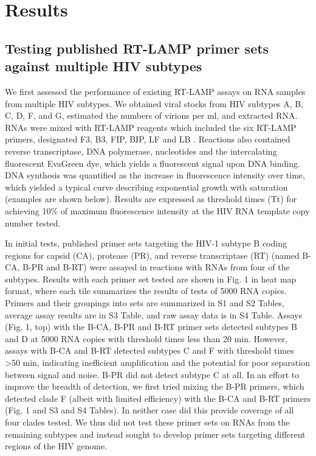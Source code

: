 \documentclass[../sherrill-Mix_thesis.tex]{subfiles}
\begin{document}
\section{Results}

\subsection{Testing published RT-LAMP primer sets against multiple HIV subtypes}

We first assessed the performance of existing RT-LAMP assays on RNA samples from multiple HIV subtypes. We obtained viral stocks from HIV subtypes A, B, C, D, F, and G, estimated the numbers of virions per ml, and extracted RNA. RNAs were mixed with RT-LAMP reagents which included the six RT-LAMP primers, designated F3, B3, FIP, BIP, LF and LB \citep{Notomi2000}. Reactions also contained reverse transcriptase, DNA polymerase, nucleotides and the intercalating fluorescent EvaGreen dye, which yields a fluorescent signal upon DNA binding. DNA synthesis was quantified as the increase in fluorescence intensity over time, which yielded a typical curve describing exponential growth with saturation (examples are shown below). Results are expressed as threshold times (Tt) for achieving 10\% of maximum fluorescence intensity at the HIV RNA template copy number tested.

In initial tests, published primer sets targeting the HIV-1 subtype B coding regions for capsid (CA), protease (PR), and reverse transcriptase (RT) (named B-CA, B-PR and B-RT) were assayed in reactions with RNAs from four of the subtypes. Results with each primer set tested are shown in Fig. 1 in heat map format, where each tile summarizes the results of tests of 5000 RNA copies. Primers and their groupings into sets are summarized in S1 and S2 Tables, average assay results are in S3 Table, and raw assay data is in S4 Table. Assays (Fig. 1, top) with the B-CA, B-PR and B-RT primer sets detected subtypes B and D at 5000 RNA copies with threshold times less than 20 min. However, assays with B-CA and B-RT detected subtypes C and F with threshold times >50 min, indicating inefficient amplification and the potential for poor separation between signal and noise. B-PR did not detect subtype C at all. In an effort to improve the breadth of detection, we first tried mixing the B-PR primers, which detected clade F (albeit with limited efficiency) with the B-CA and B-RT primers (Fig. 1 and S3 and S4 Tables). In neither case did this provide coverage of all four clades tested. We thus did not test these primer sets on RNAs from the remaining subtypes and instead sought to develop primer sets targeting different regions of the HIV genome.
\end{document}
